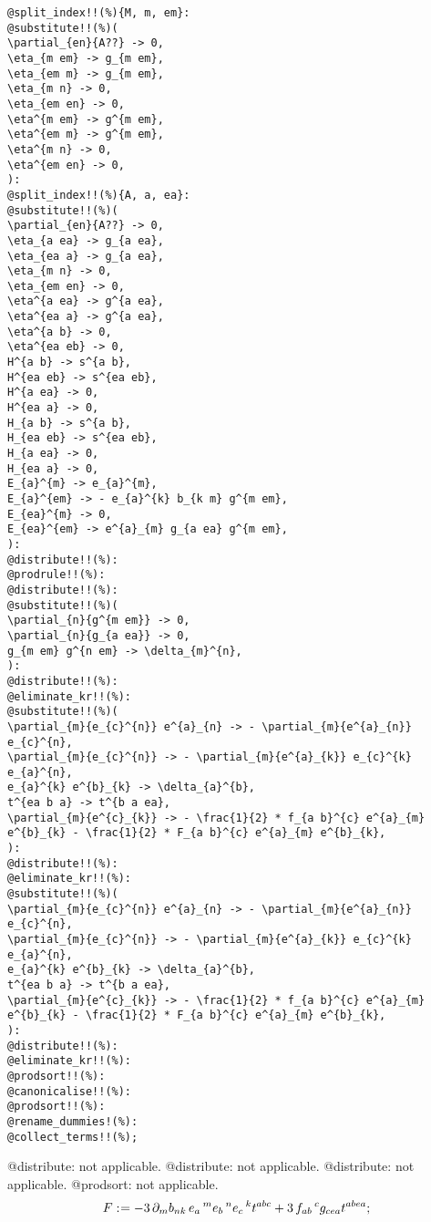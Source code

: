 \documentclass[11pt]{article}
\def\specialcolon{\mathrel{\mathop{:}}\hspace{-.5em}}
\begin{document}
{\color[named]{Blue}\begin{verbatim}
@split_index!!(%){M, m, em}:
@substitute!!(%)(
\partial_{en}{A??} -> 0,
\eta_{m em} -> g_{m em},
\eta_{em m} -> g_{m em},
\eta_{m n} -> 0,
\eta_{em en} -> 0,
\eta^{m em} -> g^{m em},
\eta^{em m} -> g^{m em},
\eta^{m n} -> 0,
\eta^{em en} -> 0,
):
@split_index!!(%){A, a, ea}:
@substitute!!(%)(
\partial_{en}{A??} -> 0,
\eta_{a ea} -> g_{a ea},
\eta_{ea a} -> g_{a ea},
\eta_{m n} -> 0,
\eta_{em en} -> 0,
\eta^{a ea} -> g^{a ea},
\eta^{ea a} -> g^{a ea},
\eta^{a b} -> 0,
\eta^{ea eb} -> 0,
H^{a b} -> s^{a b},
H^{ea eb} -> s^{ea eb},
H^{a ea} -> 0,
H^{ea a} -> 0,
H_{a b} -> s^{a b},
H_{ea eb} -> s^{ea eb},
H_{a ea} -> 0,
H_{ea a} -> 0,
E_{a}^{m} -> e_{a}^{m},
E_{a}^{em} -> - e_{a}^{k} b_{k m} g^{m em},
E_{ea}^{m} -> 0,
E_{ea}^{em} -> e^{a}_{m} g_{a ea} g^{m em},
):
@distribute!!(%):
@prodrule!!(%):
@distribute!!(%):
@substitute!!(%)(
\partial_{n}{g^{m em}} -> 0,
\partial_{n}{g_{a ea}} -> 0,
g_{m em} g^{n em} -> \delta_{m}^{n},
):
@distribute!!(%):
@eliminate_kr!!(%):
@substitute!!(%)(
\partial_{m}{e_{c}^{n}} e^{a}_{n} -> - \partial_{m}{e^{a}_{n}} e_{c}^{n},
\partial_{m}{e_{c}^{n}} -> - \partial_{m}{e^{a}_{k}} e_{c}^{k} e_{a}^{n},
e_{a}^{k} e^{b}_{k} -> \delta_{a}^{b},
t^{ea b a} -> t^{b a ea},
\partial_{m}{e^{c}_{k}} -> - \frac{1}{2} * f_{a b}^{c} e^{a}_{m} e^{b}_{k} - \frac{1}{2} * F_{a b}^{c} e^{a}_{m} e^{b}_{k},
):
@distribute!!(%):
@eliminate_kr!!(%):
@substitute!!(%)(
\partial_{m}{e_{c}^{n}} e^{a}_{n} -> - \partial_{m}{e^{a}_{n}} e_{c}^{n},
\partial_{m}{e_{c}^{n}} -> - \partial_{m}{e^{a}_{k}} e_{c}^{k} e_{a}^{n},
e_{a}^{k} e^{b}_{k} -> \delta_{a}^{b},
t^{ea b a} -> t^{b a ea},
\partial_{m}{e^{c}_{k}} -> - \frac{1}{2} * f_{a b}^{c} e^{a}_{m} e^{b}_{k} - \frac{1}{2} * F_{a b}^{c} e^{a}_{m} e^{b}_{k},
):
@distribute!!(%):
@eliminate_kr!!(%):
@prodsort!!(%):
@canonicalise!!(%):
@prodsort!!(%):
@rename_dummies!(%):
@collect_terms!!(%);
\end{verbatim}}
@distribute: not applicable.
@distribute: not applicable.
@distribute: not applicable.
@prodsort: not applicable.
\begin{dmath*}[compact, spread=2pt]
F\specialcolon{}=  - 3\, {\partial}_{m}{{b}_{n k}}\,  {e}_{a}\,^{m} {e}_{b}\,^{n} {e}_{c}\,^{k} {t}^{a b c} + 3\, {f}_{a b}\,^{c} {g}_{c ea} {t}^{a b ea};
\end{dmath*}
\end{document}
